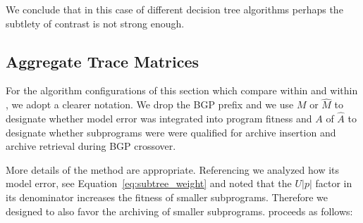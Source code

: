 %
%
%
%
%
%
We conclude that in this case of different decision tree algorithms perhaps the subtlety of contrast is not strong enough.  

\subsection{Aggregate Trace Matrices}\label{sect:agg-features}
For the algorithm configurations of this section which compare within \FULL and within \DRAW, we adopt a clearer notation. We drop the BGP prefix and we use $M$ or $\hat M$ to designate whether model error was integrated into program fitness and $A$ of $\hat A$ to designate whether subprograms were were qualified for archive insertion and archive retrieval during BGP crossover.

More details of the \DRAW method are appropriate.  Referencing \cite{krawiecGecco2014} we analyzed how its model error, see Equation~\ref{eq:subtree_weight} and noted that  the $U|p|$ factor in its denominator increases the fitness of smaller subprograms. Therefore we designed \DRAW to also favor the archiving of smaller subprograms.  \DRAW proceeds as follows:

